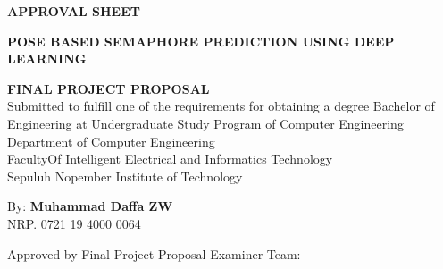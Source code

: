 \begin{center}
	\large
  \textbf{APPROVAL SHEET}
\end{center}

\thispagestyle{empty}

\begin{center}
  \textbf{POSE BASED SEMAPHORE PREDICTION USING DEEP LEARNING}
\end{center}

\begingroup
  \small

  \begin{center}
    \textbf{FINAL PROJECT PROPOSAL} \\
    Submitted to fulfill one of the requirements for obtaining a degree
    Bachelor of Engineering at 
    Undergraduate Study Program of Computer Engineering \\
    Department of Computer Engineering \\
    FacultyOf Intelligent Electrical and Informatics Technology  \\
    Sepuluh Nopember Institute of Technology
  \end{center}

  \begin{center}
    By: \textbf{Muhammad Daffa ZW} \\
    NRP. 0721 19 4000 0064
  \end{center}

  \begin{center}
    Approved by Final Project Proposal Examiner Team:
  \end{center}

  \begingroup
    \setlength{\tabcolsep}{0pt}


